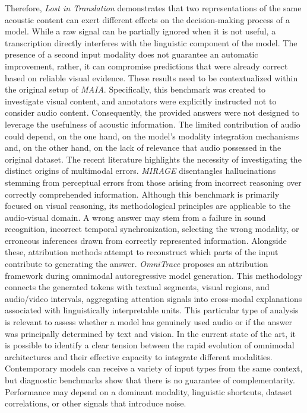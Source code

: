 Therefore, \textit{Lost in Translation} demonstrates that two representations of the same acoustic content can exert different effects on the decision-making process of a model.
While a raw signal can be partially ignored when it is not useful, a transcription directly interferes with the linguistic component of the model. The presence of a second input modality does not guarantee an automatic improvement, rather, it can compromise predictions that were already correct based on reliable visual evidence.
These results need to be contextualized within the original setup of \textit{\acs{MAIA}}. Specifically, this benchmark was created to investigate visual content, and annotators were explicitly instructed not to consider audio content. Consequently, the provided answers were not designed to leverage the usefulness of acoustic information. The limited contribution of audio could depend, on the one hand, on the model's modality integration mechanisms and, on the other hand, on the lack of relevance that audio possessed in the original dataset.
The recent literature highlights the necessity of investigating the distinct origins of multimodal errors. \textit{\acs{MIRAGE}} \cite{dong2025mirage} disentangles hallucinations stemming from perceptual errors from those arising from incorrect reasoning over correctly comprehended information. Although this benchmark is primarily focused on visual reasoning, its methodological principles are applicable to the audio-visual domain. A wrong answer may stem from a failure in sound recognition, incorrect temporal synchronization, selecting the wrong modality, or erroneous inferences drawn from correctly represented information.
Alongside these, attribution methods attempt to reconstruct which parts of the input contribute to generating the answer. \textit{OmniTrace} proposes an attribution framework during omnimodal autoregressive model generation. This methodology connects the generated tokens with textual segments, visual regions, and audio/video intervals, aggregating attention signals into cross-modal explanations associated with linguistically interpretable units. This particular type of analysis is relevant to assess whether a model has genuinely used audio or if the answer was principally determined by text and vision.
In the current state of the art, it is possible to identify a clear tension between the rapid evolution of omnimodal architectures and their effective capacity to integrate different modalities. Contemporary models can receive a variety of input types from the same context, but diagnostic benchmarks show that there is no guarantee of complementarity. Performance may depend on a dominant modality, linguistic shortcuts, dataset correlations, or other signals that introduce noise.
